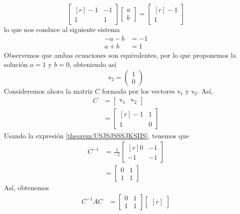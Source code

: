 \begin{example}
$$\begin{bmatrix*}[r]
        -1 & -1 \\
        1 & 1
    \end{bmatrix*} \begin{bmatrix}
        a \\
        b
    \end{bmatrix} = \begin{bmatrix*}[r]
        -1 \\
        1
    \end{bmatrix*}$$\newpage\noindent
    lo que nos conduce al siguiente sistema
    \begin{align*}
        -a - b & = -1 \\
        a + b & = 1
    \end{align*}
    Observemos que ambas ecuaciones son equivalentes, por lo que proponemos la solución $a = 1$ y $b = 0$, obteniendo así
    $$\mathbb{v}_2 = \begin{pmatrix*} 1 \\ 0 \end{pmatrix*}$$
    Consideremos ahora la matriz $C$ formada por los vectores $\mathbb{v}_1$ y $\mathbb{v}_2$. Así,
    \begin{align*}
        C & = \begin{bmatrix} \mathbb{v}_1 & \mathbb{v}_2 \end{bmatrix} \\
        & = \begin{bmatrix*}[r]
            -1 & 1 \\
            1 & 0
        \end{bmatrix*}
    \end{align*}
    Usando la expresión \ref{theorem:USJSJSSSJKSIIS}, tenemos que
    \begin{align*}
        C^{-1} & = \frac{1}{-1} \begin{bmatrix*}[r]
            0 & -1 \\
            -1 & -1
        \end{bmatrix*} \\
        & = \begin{bmatrix}
            0 & 1 \\
            1 & 1
        \end{bmatrix}
    \end{align*}
    Así, obtenemos
    \begin{align*}
        C^{-1}AC & = \begin{bmatrix}
            0 & 1 \\
            1 & 1
        \end{bmatrix} \begin{bmatrix*}[r]

\end{bmatrix*}
\end{align*}
\end{example}
